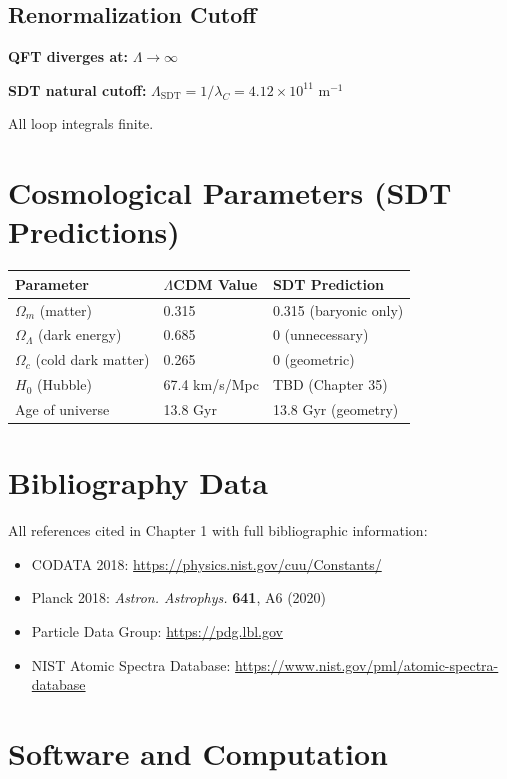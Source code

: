 \documentclass{article}
\begin{document}
\subsection{Renormalization Cutoff}

\textbf{QFT diverges at:} $\Lambda \to \infty$

\textbf{SDT natural cutoff:} $\Lambda_{\text{SDT}} = 1/\lambda_C = 4.12 \times 10^{11}$ m$^{-1}$

All loop integrals finite.

\section{Cosmological Parameters (SDT Predictions)}

\begin{longtable}{lll}
\toprule
\textbf{Parameter} & \textbf{$\Lambda$CDM Value} & \textbf{SDT Prediction} \\
\midrule
$\Omega_m$ (matter) & 0.315 & 0.315 (baryonic only) \\
$\Omega_\Lambda$ (dark energy) & 0.685 & 0 (unnecessary) \\
$\Omega_c$ (cold dark matter) & 0.265 & 0 (geometric) \\
$H_0$ (Hubble) & 67.4 km/s/Mpc & TBD (Chapter 35) \\
Age of universe & 13.8 Gyr & 13.8 Gyr (geometry) \\
\bottomrule
\end{longtable}

\section{Bibliography Data}

All references cited in Chapter 1 with full bibliographic information:

\begin{itemize}
\item CODATA 2018: \url{https://physics.nist.gov/cuu/Constants/}
\item Planck 2018: \emph{Astron. Astrophys.} \textbf{641}, A6 (2020)
\item Particle Data Group: \url{https://pdg.lbl.gov}
\item NIST Atomic Spectra Database: \url{https://www.nist.gov/pml/atomic-spectra-database}
\end{itemize}

\section{Software and Computation}
\end{document}
